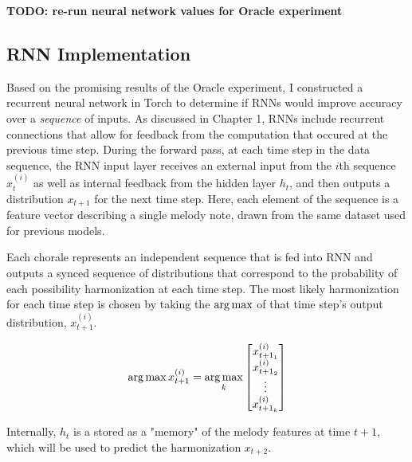 \documentclass[11pt]{article}
\begin{document}
\textbf{TODO: re-run neural network values for Oracle experiment}


\subsection{RNN Implementation}

Based on the promising results of the Oracle experiment, I constructed a recurrent neural network in Torch to determine if RNNs would improve accuracy over a \textit{sequence} of inputs. As discussed in Chapter 1, RNNs include recurrent connections that allow for feedback from the computation that occured at the previous time step. During the forward pass, at each time step in the data sequence, the RNN input layer receives an external input from the $i$th sequence $x^{(i)}_t$ as well as internal feedback from the hidden layer $h_{t}$, and then outputs a distribution $x_{t+1}$ for the next time step. Here, each element of the sequence is a feature vector describing a single melody note, drawn from the same dataset used for previous models.
\begin{center}
\end{center}

Each chorale represents an independent sequence that is fed into RNN and outputs a synced sequence of distributions that correspond to the probability of each possibility harmonization at each time step. The most likely harmonization for each time step is chosen by taking the $\argmax$ of that time step's output distribution, $x^{(i)}_{t+1}$.

$$\argmax x^{(i)}_{t + 1} = \argmax_k
\begin{bmatrix} x^{(i)}_{{t+1}_1} \\ x^{(i)}_{{t+1}_2} \\ \vdots \\ x^{(i)}_{{t+1}_k}
 \end{bmatrix}
 $$

Internally, $h_t$ is a stored as a "memory" of the melody features at time $t + 1$, which will be used to predict the harmonization $x_{t+2}$. \\
\end{document}
